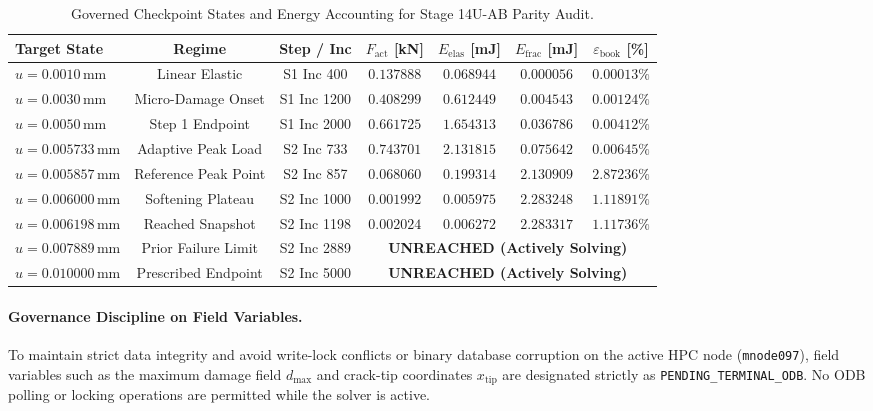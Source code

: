 \begin{table}[htbp]
  \centering
  \small
  \caption{Governed Checkpoint States and Energy Accounting for Stage 14U-AB Parity Audit.}
  \label{tab:stage14uab_governed_states}
  \begin{tabular}{lcccccc}
    \hline
    \textbf{Target State} & \textbf{Regime} & \textbf{Step / Inc} & $F_{\mathrm{act}}$ [kN] & $E_{\mathrm{elas}}$ [mJ] & $E_{\mathrm{frac}}$ [mJ] & $\varepsilon_{\mathrm{book}}$ [\%] \\
    \hline
    $u = 0.0010\,\mathrm{mm}$ & Linear Elastic & S1 Inc 400 & $0.137888$ & $0.068944$ & $0.000056$ & $0.00013\%$ \\
    $u = 0.0030\,\mathrm{mm}$ & Micro-Damage Onset & S1 Inc 1200 & $0.408299$ & $0.612449$ & $0.004543$ & $0.00124\%$ \\
    $u = 0.0050\,\mathrm{mm}$ & Step 1 Endpoint & S1 Inc 2000 & $0.661725$ & $1.654313$ & $0.036786$ & $0.00412\%$ \\
    $u = 0.005733\,\mathrm{mm}$ & Adaptive Peak Load & S2 Inc 733 & $0.743701$ & $2.131815$ & $0.075642$ & $0.00645\%$ \\
    $u = 0.005857\,\mathrm{mm}$ & Reference Peak Point & S2 Inc 857 & $0.068060$ & $0.199314$ & $2.130909$ & $2.87236\%$ \\
    $u = 0.006000\,\mathrm{mm}$ & Softening Plateau & S2 Inc 1000 & $0.001992$ & $0.005975$ & $2.283248$ & $1.11891\%$ \\
    $u = 0.006198\,\mathrm{mm}$ & Reached Snapshot & S2 Inc 1198 & $0.002024$ & $0.006272$ & $2.283317$ & $1.11736\%$ \\
    $u = 0.007889\,\mathrm{mm}$ & Prior Failure Limit & S2 Inc 2889 & \multicolumn{4}{c}{\textbf{UNREACHED (Actively Solving)}} \\
    $u = 0.010000\,\mathrm{mm}$ & Prescribed Endpoint & S2 Inc 5000 & \multicolumn{4}{c}{\textbf{UNREACHED (Actively Solving)}} \\
    \hline
  \end{tabular}
\end{table}

\paragraph{Governance Discipline on Field Variables.}
To maintain strict data integrity and avoid write-lock conflicts or binary database corruption on the active HPC node (\texttt{mnode097}), field variables such as the maximum damage field $d_{\max}$ and crack-tip coordinates $x_{\mathrm{tip}}$ are designated strictly as \texttt{PENDING\_TERMINAL\_ODB}. No ODB polling or locking operations are permitted while the solver is active.


